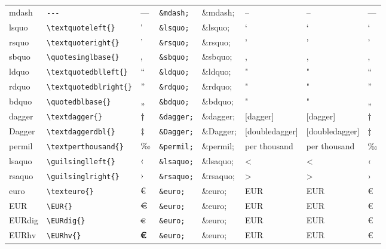 \documentclass[11pt]{article}
\begin{document}
\begin{longtable}{llllllll}
mdash & \texttt{-{}-{}-} & $\mbox{---}$ & \texttt{\&mdash;} & \&mdash; & -- & -- & —\\
lsquo & \texttt{\textbackslash{}textquoteleft\{\}} & $\mbox{\textquoteleft{}}$ & \texttt{\&lsquo;} & \&lsquo; & ` & ` & ‘\\
rsquo & \texttt{\textbackslash{}textquoteright\{\}} & $\mbox{\textquoteright{}}$ & \texttt{\&rsquo;} & \&rsquo; & ' & ' & ’\\
sbquo & \texttt{\textbackslash{}quotesinglbase\{\}} & $\mbox{\quotesinglbase{}}$ & \texttt{\&sbquo;} & \&sbquo; & , & , & ‚\\
ldquo & \texttt{\textbackslash{}textquotedblleft\{\}} & $\mbox{\textquotedblleft{}}$ & \texttt{\&ldquo;} & \&ldquo; & " & " & “\\
rdquo & \texttt{\textbackslash{}textquotedblright\{\}} & $\mbox{\textquotedblright{}}$ & \texttt{\&rdquo;} & \&rdquo; & " & " & ”\\
bdquo & \texttt{\textbackslash{}quotedblbase\{\}} & $\mbox{\quotedblbase{}}$ & \texttt{\&bdquo;} & \&bdquo; & " & " & „\\
dagger & \texttt{\textbackslash{}textdagger\{\}} & $\mbox{\textdagger{}}$ & \texttt{\&dagger;} & \&dagger; & [dagger] & [dagger] & †\\
Dagger & \texttt{\textbackslash{}textdaggerdbl\{\}} & $\mbox{\textdaggerdbl{}}$ & \texttt{\&Dagger;} & \&Dagger; & [doubledagger] & [doubledagger] & ‡\\
permil & \texttt{\textbackslash{}textperthousand\{\}} & $\mbox{\textperthousand{}}$ & \texttt{\&permil;} & \&permil; & per thousand & per thousand & ‰\\
lsaquo & \texttt{\textbackslash{}guilsinglleft\{\}} & $\mbox{\guilsinglleft{}}$ & \texttt{\&lsaquo;} & \&lsaquo; & < & < & ‹\\
rsaquo & \texttt{\textbackslash{}guilsinglright\{\}} & $\mbox{\guilsinglright{}}$ & \texttt{\&rsaquo;} & \&rsaquo; & > & > & ›\\
euro & \texttt{\textbackslash{}texteuro\{\}} & $\mbox{\texteuro{}}$ & \texttt{\&euro;} & \&euro; & EUR & EUR & €\\
EUR & \texttt{\textbackslash{}EUR\{\}} & $\mbox{\EUR{}}$ & \texttt{\&euro;} & \&euro; & EUR & EUR & €\\
EURdig & \texttt{\textbackslash{}EURdig\{\}} & $\mbox{\EURdig{}}$ & \texttt{\&euro;} & \&euro; & EUR & EUR & €\\
EURhv & \texttt{\textbackslash{}EURhv\{\}} & $\mbox{\EURhv{}}$ & \texttt{\&euro;} & \&euro; & EUR & EUR & €\\

\end{longtable}
\end{document}

